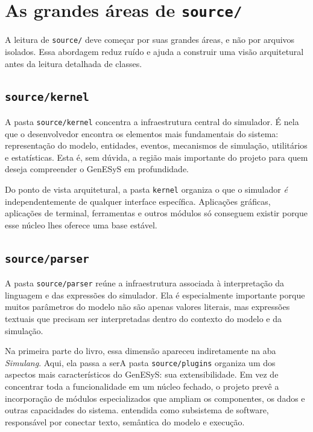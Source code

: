 \section{As grandes áreas de \texttt{source/}}
\label{sec:cap6_grandes_areas_source}

A leitura de \texttt{source/} deve começar por suas grandes áreas, e não por arquivos isolados. Essa abordagem reduz ruído e ajuda a construir uma visão arquitetural antes da leitura detalhada de classes.

\subsection{\texttt{source/kernel}}
\label{subsec:cap6_source_kernel}

A pasta \texttt{source/kernel} concentra a infraestrutura central do simulador. É nela que o desenvolvedor encontra os elementos mais fundamentais do sistema: representação do modelo, entidades, eventos, mecanismos de simulação, utilitários e estatísticas. Esta é, sem dúvida, a região mais importante do projeto para quem deseja compreender o GenESyS em profundidade.

Do ponto de vista arquitetural, a pasta \texttt{kernel} organiza o que o simulador \emph{é} independentemente de qualquer interface específica. Aplicações gráficas, aplicações de terminal, ferramentas e outros módulos só conseguem existir porque esse núcleo lhes oferece uma base estável.

\subsection{\texttt{source/parser}}
\label{subsec:cap6_source_parser}

A pasta \texttt{source/parser} reúne a infraestrutura associada à interpretação da linguagem e das expressões do simulador. Ela é especialmente importante porque muitos parâmetros do modelo não são apenas valores literais, mas expressões textuais que precisam ser interpretadas dentro do contexto do modelo e da simulação.

Na primeira parte do livro, essa dimensão apareceu indiretamente na aba \textit{Simulang}. Aqui, ela passa a serA pasta \texttt{source/plugins} organiza um dos aspectos mais característicos do GenESyS: sua extensibilidade. Em vez de concentrar toda a funcionalidade em um núcleo fechado, o projeto prevê a incorporação de módulos especializados que ampliam os componentes, os dados e outras capacidades do sistema. entendida como subsistema de software, responsável por conectar texto, semântica do modelo e execução.

